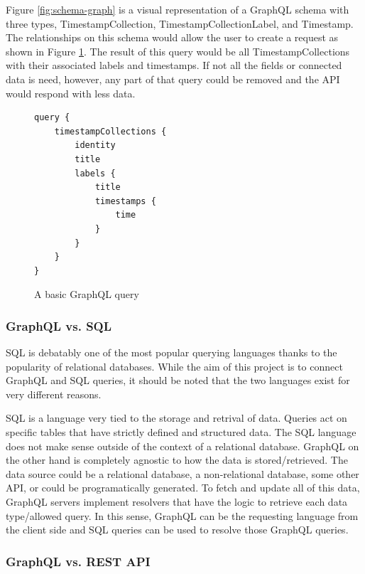 Figure \ref{fig:schema-graph} is a visual representation of a GraphQL schema with three types, TimestampCollection, TimestampCollectionLabel, and Timestamp.  The relationships on this schema would allow the user to create a request as shown in Figure \ref{fig:basic-query}.  The result of this query would be all TimestampCollections with their associated labels and timestamps.  If not all the fields or connected data is need, however, any part of that query could be removed and the API would respond with less data.

\begin{figure}
    \begin{verbatim}
query {
    timestampCollections {
        identity
        title
        labels {
            title
            timestamps {
                time
            }
        }
    }
}
    \end{verbatim}
    \caption{A basic GraphQL query}
    \label{fig:basic-query}
\end{figure}

\subsubsection{GraphQL vs. SQL}

SQL is debatably one of the most popular querying languages thanks to the popularity of relational databases.  While the aim of this project is to connect GraphQL and SQL queries, it should be noted that the two languages exist for very different reasons.

SQL is a language very tied to the storage and retrival of data.  Queries act on specific tables that have strictly defined and structured data.  The SQL language does not make sense outside of the context of a relational database.  GraphQL on the other hand is completely agnostic to how the data is stored/retrieved.  The data source could be a relational database, a non-relational database, some other API, or could be programatically generated. To fetch and update all of this data, GraphQL servers implement resolvers that have the logic to retrieve each data type/allowed query.  In this sense, GraphQL can be the requesting language from the client side and SQL queries can be used to resolve those GraphQL queries.

\subsubsection{GraphQL vs. REST API}